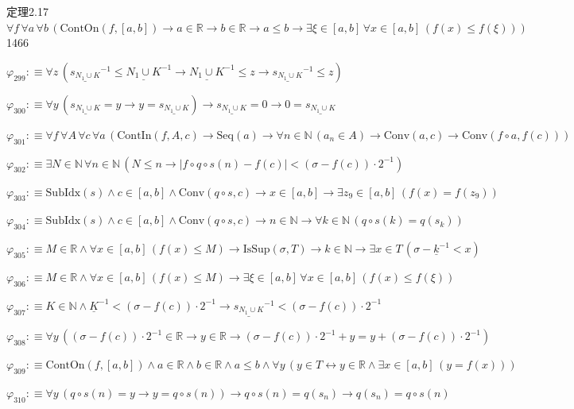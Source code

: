 \begin{fullproof}{定理2.17}{$\forall f\,\forall a\,\forall b\,(\mathrm{ContOn}(f,[a,b]) \to a \in \mathbb{R} \to b \in \mathbb{R} \to a \leq b \to \exists \xi \in [a,b]\,\forall x \in [a,b]\,(f(x) \leq f(\xi)))$}{1466}
\begin{abbrevlist}
\item $\varphi_{299} :\equiv \forall z\,(\underline{s_{N_{1} \cup K}}^{-1} \leq \underline{N_{1} \cup K}^{-1} \to \underline{N_{1} \cup K}^{-1} \leq z \to \underline{s_{N_{1} \cup K}}^{-1} \leq z)$
\item $\varphi_{300} :\equiv \forall y\,(\underline{s_{N_{1} \cup K}} = y \to y = \underline{s_{N_{1} \cup K}}) \to \underline{s_{N_{1} \cup K}} = 0 \to 0 = \underline{s_{N_{1} \cup K}}$
\item $\varphi_{301} :\equiv \forall f\,\forall A\,\forall c\,\forall a\,(\mathrm{ContIn}(f,A,c) \to \mathrm{Seq}(a) \to \forall n \in \mathbb{N}\,(a_{n} \in A) \to \mathrm{Conv}(a,c) \to \mathrm{Conv}(f \circ a,f(c)))$
\item $\varphi_{302} :\equiv \exists N \in \mathbb{N}\,\forall n \in \mathbb{N}\,(N \leq n \to \lvert f \circ q \circ s(n) - f(c) \rvert < (\sigma - f(c)) \cdot 2^{-1})$
\item $\varphi_{303} :\equiv \mathrm{SubIdx}(s) \land c \in [a,b] \land \mathrm{Conv}(q \circ s,c) \to x \in [a,b] \to \exists z_{9} \in [a,b]\,(f(x) = f(z_{9}))$
\item $\varphi_{304} :\equiv \mathrm{SubIdx}(s) \land c \in [a,b] \land \mathrm{Conv}(q \circ s,c) \to n \in \mathbb{N} \to \forall k \in \mathbb{N}\,(q \circ s(k) = q(s_{k}))$
\item $\varphi_{305} :\equiv M \in \mathbb{R} \land \forall x \in [a,b]\,(f(x) \leq M) \to \mathrm{IsSup}(\sigma,T) \to k \in \mathbb{N} \to \exists x \in T\,(\sigma - \underline{k}^{-1} < x)$
\item $\varphi_{306} :\equiv M \in \mathbb{R} \land \forall x \in [a,b]\,(f(x) \leq M) \to \exists \xi \in [a,b]\,\forall x \in [a,b]\,(f(x) \leq f(\xi))$
\item $\varphi_{307} :\equiv K \in \mathbb{N} \land \underline{K}^{-1} < (\sigma - f(c)) \cdot 2^{-1} \to \underline{s_{N_{1} \cup K}}^{-1} < (\sigma - f(c)) \cdot 2^{-1}$
\item $\varphi_{308} :\equiv \forall y\,((\sigma - f(c)) \cdot 2^{-1} \in \mathbb{R} \to y \in \mathbb{R} \to (\sigma - f(c)) \cdot 2^{-1} + y = y + (\sigma - f(c)) \cdot 2^{-1})$
\item $\varphi_{309} :\equiv \mathrm{ContOn}(f,[a,b]) \land a \in \mathbb{R} \land b \in \mathbb{R} \land a \leq b \land \forall y\,(y \in T \leftrightarrow y \in \mathbb{R} \land \exists x \in [a,b]\,(y = f(x)))$
\item $\varphi_{310} :\equiv \forall y\,(q \circ s(n) = y \to y = q \circ s(n)) \to q \circ s(n) = q(s_{n}) \to q(s_{n}) = q \circ s(n)$

\end{abbrevlist}
\end{fullproof}
